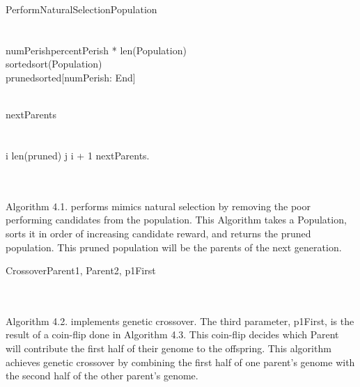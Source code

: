 \documentclass{article}
\begin{document}
        



\begin{pseudocode}[shadowbox]{PerformNaturalSelection}{Population} 
\\\\

\\ numPerish\GETS percentPerish * len(Population)
\\ sorted\GETS sort(Population)
\\ pruned\GETS sorted[numPerish: End]

\\ nextParents\GETS [ ]\\
\\\\

\FOR i \TO len(pruned) \DO
    \BEGIN 
        \FOR j \TO i + 1 \DO
                nextParents.\\ 

    \END\\

\end{pseudocode}
\\
Algorithm 4.1. performs mimics natural selection by removing the poor performing candidates from the population. This Algorithm takes a Population, sorts it in order of increasing candidate reward, and returns the pruned population. This pruned population will be the parents of the next generation.



\begin{pseudocode}[shadowbox]{Crossover}{Parent1, Parent2, p1First} 
\\
\\

\end{pseudocode}
\\
Algorithm 4.2. implements genetic crossover. The third parameter, p1First, is the result of a coin-flip done in Algorithm 4.3. This coin-flip decides which Parent will contribute the first half of their genome to the offspring. This algorithm achieves genetic crossover by combining the first half of one parent's genome with the second half of the other parent's genome. 
\end{document}

